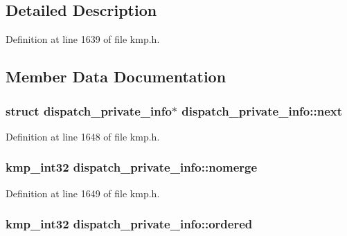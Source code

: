 \subsection{Detailed Description}


Definition at line 1639 of file kmp.\-h.



\subsection{Member Data Documentation}
\hypertarget{structdispatch__private__info_a1703e91ca6531889f397ad3ea0083fbe}{
\subsubsection[{next}]{\setlength{\rightskip}{0pt plus 5cm}struct {\bf dispatch\-\_\-private\-\_\-info}$\ast$ dispatch\-\_\-private\-\_\-info\-::next}}\label{structdispatch__private__info_a1703e91ca6531889f397ad3ea0083fbe}


Definition at line 1648 of file kmp.\-h.

\hypertarget{structdispatch__private__info_a1f6f76a7af47bc756e9ef3f785ec0630}{
\subsubsection[{nomerge}]{\setlength{\rightskip}{0pt plus 5cm}kmp\-\_\-int32 dispatch\-\_\-private\-\_\-info\-::nomerge}}\label{structdispatch__private__info_a1f6f76a7af47bc756e9ef3f785ec0630}


Definition at line 1649 of file kmp.\-h.

\hypertarget{structdispatch__private__info_a340e0ba4ef87cb74881b87fb8f511db6}{
\subsubsection[{ordered}]{\setlength{\rightskip}{0pt plus 5cm}kmp\-\_\-int32 dispatch\-\_\-private\-\_\-info\-::ordered}}\label{structdispatch__private__info_a340e0ba4ef87cb74881b87fb8f511db6}


